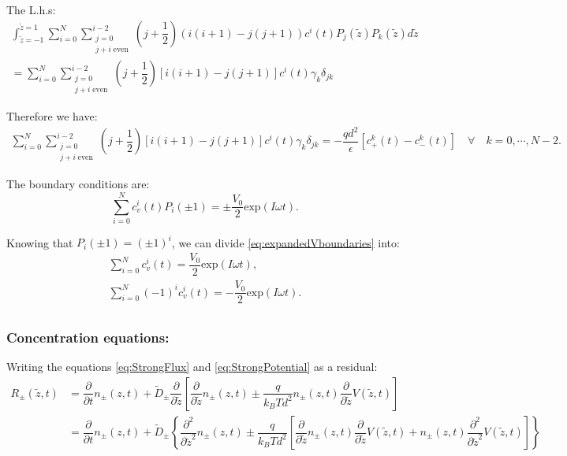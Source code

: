 \documentclass[amsmath,amsfonts,amssymb,superscriptaddress,showkeys,notitlepage,onecolumn]{revtex4-1}
\newcommand{\dpartial}[1]{\ensuremath{\dfrac{\partial}{\partial #1}}}
\newcommand{\ddpartial}[1]{\ensuremath{\dfrac{\partial^2}{\partial #1^2}}}
\newcommand{\zint}[1]{ \ensuremath{  \int_{\tilde{z}=-1}^{\tilde{z}=1} #1 d\tilde{z} } }
\newcommand{\Npm}{\ensuremath{n_{\pm}(z,t)}}
\newcommand{\legP}[1]{\ensuremath{P_{#1}(\tilde{z})}}
\begin{document}
The L.h.s:
\begin{align}\nonumber
  \zint{ \sum_{i=0}^{N} \sum_{\substack{j=0 \\  j+i \; \text{even}}}^{i-2}
  \left(j+\dfrac{1}{2} \right) \left(i(i+1)-j(j+1) \right) {c^i}(t)  \legP{j}
      P_k(\tilde{z})}  \\ \nonumber
  = \sum_{i=0}^{N} \sum_{\substack{j=0 \\  j+i \; \text{even}}}^{i-2}
  \left(j+\dfrac{1}{2} \right) \left[i(i+1)-j(j+1) \right] {c^i}(t)\gamma_k \delta_{jk}
\end{align}

Therefore we have:
\begin{align}
\sum_{i=0}^{N} \sum_{\substack{j=0 \\  j+i \; \text{even}}}^{i-2}
  \left(j+\dfrac{1}{2} \right) \left[i(i+1)-j(j+1) \right] {c^i}(t)\gamma_k \delta_{jk}=-\dfrac{q d^2}{\epsilon}  [c^k_{+}(t)  - c^k_{-}(t)] \quad \forall \quad k=0,\cdots, N-2.
\end{align}

The boundary conditions are:
\begin{equation}\label{eq:expandedVboundaries}
 \sum_{i=0}^N {c^i_{v}(t)} P_i(\pm 1)=\pm \dfrac{V_0}{2} \text{exp}(I \omega t).
\end{equation}

Knowing that $P_i(\pm 1)=(\pm 1)^i$, we can divide \eqref{eq:expandedVboundaries} into:
\begin{align}\nonumber
  \sum_{i=0}^N {c^i_{v}(t)}= \dfrac{V_0}{2} \text{exp}(I \omega t),\\
  \sum_{i=0}^N (-1)^i {c^i_{v}(t)}= -\dfrac{V_0}{2} \text{exp}(I \omega t).\\
\end{align}

\subsubsection{Concentration equations:}


Writing the equations \eqref{eq:StrongFlux} and \eqref{eq:StrongPotential} as a residual:
\begin{align}\label{eq:Residual}\nonumber
  R_{\pm}(\tilde{z},t)&= \dpartial{t} \Npm+\tilde{D}_\pm \dpartial{\tilde{z}}\left[\dpartial{\tilde{z}}\Npm \pm \dfrac{q}{k_B T d^2} \Npm \dpartial{\tilde{z}} V(\tilde{z},t) \right]\\
  &=\dpartial{t} \Npm+\tilde{D}_\pm\left\lbrace\ddpartial{\tilde{z}}\Npm \pm \dfrac{q}{k_B T d^2} \left[\dpartial{\tilde{z}} \Npm \dpartial{\tilde{z}} V(\tilde{z},t) + \Npm \ddpartial{\tilde{z}} V(\tilde{z},t)\right] \right\rbrace
\end{align}
\end{document}
